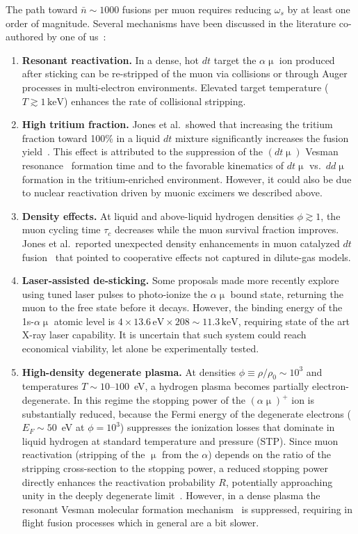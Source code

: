 \documentclass[particles,article,accept,pdftex,moreauthors]{Definitions/mdpi}
\begin{document}
The path toward $\bar{n}\sim 1000$ fusions per muon requires reducing $\omega_s$ by at least one order of magnitude. Several mechanisms have been discussed in the literature co-authored by one of us~\cite{Rafelski:1987Jones,Rafelski:1990gg,Rafelski:1990in}: 

\begin{enumerate}
\item {\bf Resonant reactivation.} In a dense, hot $dt$ target the $\alpha\upmu$ ion produced after sticking can be re-stripped of the muon via collisions or through Auger processes in multi-electron environments. Elevated target temperature ($T \gtrsim 1\,\mathrm{keV}$) enhances the rate of collisional stripping. 
%
\item {\bf High tritium fraction.} Jones et al.\ showed that increasing the tritium fraction toward 100\% in a liquid $dt$ mixture significantly increases the fusion yield~\cite{jones1993evaluation}. This effect is attributed to the suppression of the $(dt\upmu)$ Vesman resonance~\cite{Vesman:1967} formation time and to the favorable kinematics of $dt\upmu$ vs.\ $dd\upmu$ formation in the tritium-enriched environment. However, it could also be due to nuclear reactivation driven by muonic excimers we described above.
%
\item {\bf Density effects.} At liquid and above-liquid hydrogen densities $\phi \gtrsim 1$, the muon cycling time $\tau_c$ decreases while the muon survival fraction improves. Jones et al.\ reported unexpected density enhancements in muon catalyzed $dt$ fusion~\cite{Jones:1986kk} that pointed to cooperative effects not captured in dilute-gas models. 
%
\item {\bf Laser-assisted de-sticking.} Some proposals made more recently explore using tuned laser pulses to photo-ionize the $\alpha\upmu$ bound state, returning the muon to the free state before it decays. However, the binding energy of the 1s-$\alpha\upmu$ atomic level is $4\times 13.6\,\mathrm{eV}\times 208\sim 11.3\,\mathrm{keV}$, requiring state of the art X-ray laser capability. It is uncertain that such system could reach economical viability, let alone be experimentally tested.
%
\item {\bf High-density degenerate plasma.} At densities $\phi\equiv\rho/\rho_0\sim 10^3$ and temperatures $T\sim 10$--$100$~eV, a hydrogen plasma becomes partially electron-degenerate. In this regime the stopping power of the $(\alpha\upmu)^+$ ion is substantially reduced, because the Fermi energy of the degenerate electrons ($E_F\sim 50$~eV at $\phi=10^3$) suppresses the ionization losses that dominate in liquid hydrogen at standard temperature and pressure (STP). Since muon reactivation (stripping of the $\upmu$ from the $\alpha$) depends on the ratio of the stripping cross-section to the stopping power, a reduced stopping power directly enhances the reactivation probability $R$, potentially approaching unity in the deeply degenerate limit~\cite{Rafelski:1988wq,Rafelski:1991DOE}. However, in a dense plasma the resonant Vesman molecular formation mechanism~\cite{Vesman:1967} is suppressed, requiring in flight fusion processes which in general are a bit slower.
%
\end{enumerate}
\end{document}

